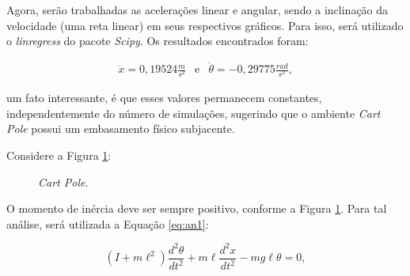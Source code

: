 \documentclass[12pt,           %
a4paper,                       %
openany,                       %
oneside,                       %
chapter=TITLE,                 %
english,                       %
spanish,                       %
brazil,                        %
sumario=tradicional]{abntex2}  %
\begin{document}
\begin{OnehalfSpace}
Agora, serão trabalhadas as acelerações linear e angular, sendo a inclinação da velocidade (uma reta linear) em seus respectivos gráficos. Para isso, será utilizado o \textit{linregress} do pacote \textit{Scipy}. Os resultados encontrados foram:

\begin{equation}
    \begin{matrix}
        \ddot{x} = 0,19524\frac{m}{s^2} & \text{e} & \ddot{\theta} =-0,29775\frac{rad}{s^2},
    \end{matrix}
\label{eq:vlevt}
\end{equation}

\noindent um fato interessante, é que esses valores permanecem constantes, independentemente do número de simulações, sugerindo que o ambiente \textit{Cart Pole} possui um embasamento físico subjacente.

Considere a Figura \ref{fig:cartPole}:

\begin{figure}[H]
    \centering
    \vspace*{-0.2cm}
    \caption{\textit{Cart Pole}.}
    \centering 
    \label{fig:cartPole}
\end{figure}
\vspace*{-0.8cm}
{\raggedright {}}

O momento de inércia deve ser sempre positivo, conforme a Figura \ref{fig:cartPole}. Para tal análise, será utilizada a Equação \ref{eq:an1}:

\begin{equation}
    (I + m\ell^2)\frac{d^2\theta}{dt^2} + m\ell\frac{d^2x}{dt^2} - mg\ell\theta = 0,
    \label{eq:an1}
\end{equation}


\end{OnehalfSpace}
\end{document}
